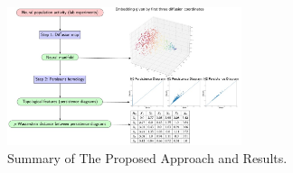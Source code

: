 \documentclass[9pt,conference]{IEEEtran}
\begin{document}
     

\begin{figure}[H]
\centering
\includegraphics[width=2.7in]{flowchart.jpg}
\caption{Summary of The Proposed Approach and Results.}
\label{fig_sim}
\end{figure}


%
\end{document}
